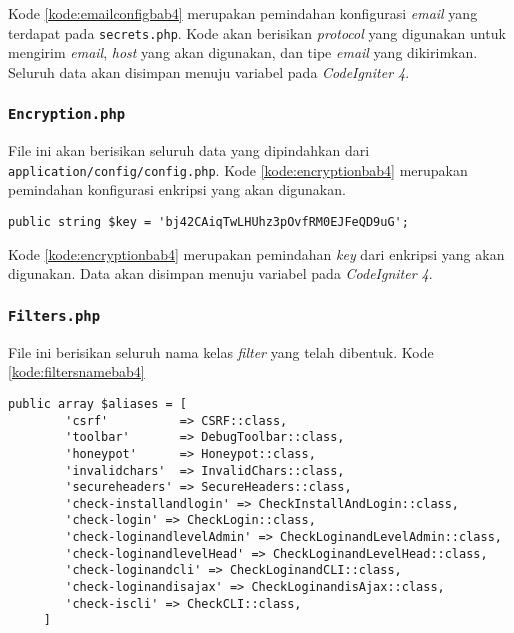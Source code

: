 Kode \ref{kode:emailconfigbab4} merupakan pemindahan konfigurasi \textit{email} yang terdapat pada \texttt{secrets.php}. Kode akan berisikan \textit{protocol} yang digunakan untuk mengirim \textit{email}, \textit{host} yang akan digunakan, dan tipe \textit{email} yang dikirimkan. Seluruh data akan disimpan menuju variabel pada \textit{CodeIgniter 4}.

\subsubsection{\texttt{Encryption.php}}
File ini akan berisikan seluruh data yang dipindahkan dari \texttt{application/config/config.php}. Kode \ref{kode:encryptionbab4} merupakan pemindahan konfigurasi enkripsi yang akan digunakan.

\begin{lstlisting}[caption=Pemindahan \texttt{app/config/config.php} menuju \texttt{Encryption.php}, label=kode:encryptionbab4]
    public string $key = 'bj42CAiqTwLHUhz3pOvfRM0EJFeQD9uG';
\end{lstlisting}

Kode \ref{kode:encryptionbab4} merupakan pemindahan \textit{key} dari enkripsi yang akan digunakan. Data akan disimpan menuju variabel pada \textit{CodeIgniter 4}.

\subsubsection{\texttt{Filters.php}}
\label{subsubsec:filters}
File ini berisikan seluruh nama kelas \textit{filter} yang telah dibentuk. Kode \ref{kode:filtersnamebab4}

\begin{lstlisting}[caption=Penambahan nama \textit{filters} untuk didefinisikan menuju \textit{routes}, label=kode:filtersnamebab4]
	public array $aliases = [
        'csrf'          => CSRF::class,
        'toolbar'       => DebugToolbar::class,
        'honeypot'      => Honeypot::class,
        'invalidchars'  => InvalidChars::class,
        'secureheaders' => SecureHeaders::class,
        'check-installandlogin' => CheckInstallAndLogin::class,
        'check-login' => CheckLogin::class,
        'check-loginandlevelAdmin' => CheckLoginandLevelAdmin::class,
        'check-loginandlevelHead' => CheckLoginandLevelHead::class,
        'check-loginandcli' => CheckLoginandCLI::class,
        'check-loginandisajax' => CheckLoginandisAjax::class,
        'check-iscli' => CheckCLI::class,
     ]
\end{lstlisting}

